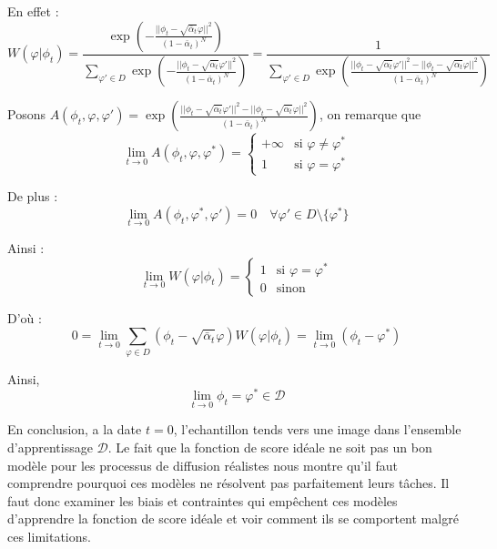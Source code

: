 \documentclass[a4paper,10pt]{article}
\theoremstyle{definition} %
\theoremstyle{definition} %
\theoremstyle{definition} %
\theoremstyle{definition} %
\begin{document}
En effet :
\begin{equation*}
    W(\varphi | \phi_t) =
\frac{\exp\left( -\frac{||\phi_t - \sqrt{\bar{\alpha}_t} \varphi||^2}{(1 - \bar{\alpha}_t)^N} \right)}
{\sum\limits_{\varphi' \in D} \exp\left( -\frac{||\phi_t - \sqrt{\bar{\alpha}_t} \varphi'||^2}{(1 - \bar{\alpha}_t)^N} \right)}
=\frac{1}{\sum\limits_{\varphi' \in D} \exp\left( \frac{||\phi_t - \sqrt{\bar{\alpha}_t} \varphi'||^2 - ||\phi_t - \sqrt{\bar{\alpha}_t} \varphi||^2}{(1 - \bar{\alpha}_t)^N} \right)}
\end{equation*}

Posons $A(\phi_t, \varphi, \varphi' ) = \exp\left( \frac{||\phi_t - \sqrt{\bar{\alpha}_t} \varphi'||^2 - ||\phi_t - \sqrt{\bar{\alpha}_t} \varphi||^2}{(1 - \bar{\alpha}_t)^N} \right)$, on remarque que
\begin{equation*}
    \lim\limits_{t \to 0} A(\phi_t, \varphi, \varphi^*) =
\begin{cases} 
+\infty & \text{si } \varphi \neq \varphi^* \\
1 & \text{si } \varphi = \varphi^*
\end{cases}
\end{equation*}

De plus :
\begin{equation*}
    \lim\limits_{t \to 0} A(\phi_t, \varphi^*, \varphi') = 0 \quad \forall \varphi' \in D \setminus \{\varphi^*\}
\end{equation*}

Ainsi :
\[
\lim\limits_{t \to 0} W(\varphi | \phi_t) =
\begin{cases} 
1 & \text{si } \varphi = \varphi^* \\
0 & \text{sinon}
\end{cases}
\]

D'où :
\[
0 = \lim\limits_{t \to 0} \sum\limits_{\varphi \in D} (\phi_t - \sqrt{\bar{\alpha}_t} \varphi) W(\varphi | \phi_t) = \lim\limits_{t \to 0} (\phi_t - \varphi^*)
\]

Ainsi,
\begin{equation*}
    \lim\limits_{t\rightarrow 0} \phi_t = \varphi^* \in \mathcal{D}
\end{equation*}

En conclusion, a la date $t = 0$, l'echantillon tends vers une image dans l'ensemble d'apprentissage $\mathcal{D}$. Le fait que la fonction de score idéale ne soit pas un bon modèle pour les processus de diffusion réalistes nous montre qu'il faut comprendre pourquoi ces modèles ne résolvent pas parfaitement leurs tâches. Il faut donc examiner les biais et contraintes qui empêchent ces modèles d'apprendre la fonction de score idéale et voir comment ils se comportent malgré ces limitations.
\end{document}

